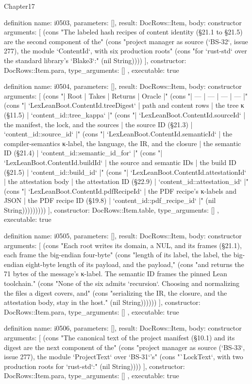 \begin{lexlean}{Chapter17}
\begin{semanticmodule}
definition{
  name: i0503,
  parameters: [],
  result: DocRows::Item,
  body: constructor{
    arguments: [
      (cons "The labeled hash recipes of content identity (§21.1 to §21.5) are the second component of the" (cons "project manager as source (`BS-32`, issue 277), the module `ContentId`, with six production roots" (cons "for `rust-std` over the standard library's `Blake3`:" (nil String))))
    ],
    constructor: DocRows::Item.para,
    type_arguments: []
  },
  executable: true
}

definition{
  name: i0504,
  parameters: [],
  result: DocRows::Item,
  body: constructor{
    arguments: [
      (cons "| Root | Takes | Returns | Oracle |" (cons "| --- | --- | --- | --- |" (cons "| `LexLeanBoot.ContentId.treeDigest` | path and content rows | the tree κ (§11.5) | `content_id::tree_kappa` |" (cons "| `LexLeanBoot.ContentId.sourceId` | the manifest, the lock, and the sources | the source ID (§21.3) | `content_id::source_id` |" (cons "| `LexLeanBoot.ContentId.semanticId` | the compiler-semantics κ-label, the language, the IR, and the closure | the semantic ID (§21.4) | `content_id::semantic_id_for` |" (cons "| `LexLeanBoot.ContentId.buildId` | the source and semantic IDs | the build ID (§21.5) | `content_id::build_id` |" (cons "| `LexLeanBoot.ContentId.attestationId` | the attestation body | the attestation ID (§22.9) | `content_id::attestation_id` |" (cons "| `LexLeanBoot.ContentId.pdfRecipeId` | the PDF recipe's κ-labels and JSON | the PDF recipe ID (§19.8) | `content_id::pdf_recipe_id` |" (nil String)))))))))
    ],
    constructor: DocRows::Item.table,
    type_arguments: []
  },
  executable: true
}

definition{
  name: i0505,
  parameters: [],
  result: DocRows::Item,
  body: constructor{
    arguments: [
      (cons "Each root writes its domain, a NUL, and its frames (§21.1), each frame the big-endian four-byte" (cons "length of its label, the label, the big-endian eight-byte length of its payload, and the payload," (cons "and returns the 71 bytes of the message's κ-label. The semantic ID frames the pinned Lean toolchain." (cons "None of the six admits `recursion`. Choosing and normalizing the files a digest covers, and" (cons "serializing the IR, the closure, and the attestation body, stay in the host." (nil String))))))
    ],
    constructor: DocRows::Item.para,
    type_arguments: []
  },
  executable: true
}

definition{
  name: i0506,
  parameters: [],
  result: DocRows::Item,
  body: constructor{
    arguments: [
      (cons "The canonical text of the project manifest (§10.1) and its digest are the next component of the" (cons "project manager as source (`BS-33`, issue 277), the module `ProjectText` over `BS-31`'s" (cons "`LockText`, with two production roots for `rust-std`:" (nil String))))
    ],
    constructor: DocRows::Item.para,
    type_arguments: []
  },
  executable: true
}


\end{semanticmodule}
\end{lexlean}
